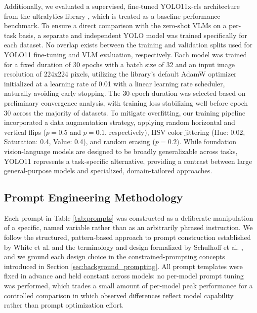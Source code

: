 \documentclass[10pt,letterpaper]{article}
\begin{document}
Additionally, we evaluated a supervised, fine-tuned YOLO11x-cls architecture from the ultralytics library \cite{khanam_yolov11_2024}, which is treated as a baseline performance benchmark. To ensure a direct comparison with the zero-shot VLMs on a per-task basis, a separate and independent YOLO model was trained specifically for each dataset. No overlap exists between the training and validation splits used for YOLO11 fine-tuning and VLM evaluation, respectively. Each model was trained for a fixed duration of 30 epochs with a batch size of 32 and an input image resolution of 224x224 pixels, utilizing the library's default AdamW optimizer initialized at a learning rate of 0.01 with a linear learning rate scheduler, naturally avoiding early stopping. The 30-epoch duration was selected based on preliminary convergence analysis, with training loss stabilizing well before epoch 30 across the majority of datasets. To mitigate overfitting, our training pipeline incorporated a data augmentation strategy, applying random horizontal and vertical flips ($p=0.5$ and $p=0.1$, respectively), HSV color jittering (Hue: 0.02, Saturation: 0.4, Value: 0.4), and random erasing ($p=0.2$). While foundation vision-language models are designed to be broadly generalizable across tasks, YOLO11 represents a task-specific alternative, providing a contrast between large general-purpose models and specialized, domain-tailored approaches.

\subsection{Prompt Engineering Methodology}
\label{sec:prompt_methodology}
Each prompt in Table \ref{tab:prompts} was constructed as a deliberate manipulation of a specific, named variable rather than as an arbitrarily phrased instruction. We follow the structured, pattern-based approach to prompt construction established by White et al. \cite{white_prompt_2023} and the terminology and design formalized by Schulhoff et al. \cite{schulhoff_prompt_2024}, and we ground each design choice in the constrained-prompting concepts introduced in Section \ref{sec:background_prompting}. All prompt templates were fixed in advance and held constant across models: no per-model prompt tuning was performed, which trades a small amount of per-model peak performance for a controlled comparison in which observed differences reflect model capability rather than prompt optimization effort.
\end{document}
